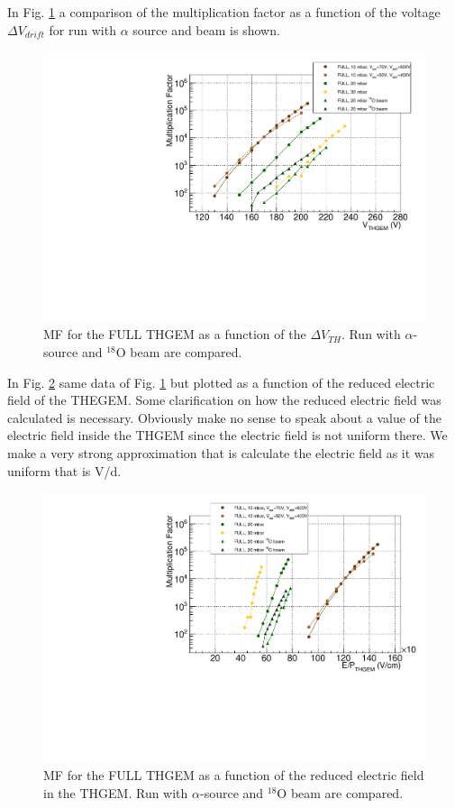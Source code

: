 \documentclass[a4paper, 11 pt]{report}
\newcommand{\Vthgem}{$\Delta V_{TH}$}
\newcommand{\Vdrift}{$ \Delta V_{drift}$}
\begin{document}
  In Fig. \ref{fig:MF_FULL_beam} a comparison of the multiplication factor as a function of the
  voltage \Vdrift{} for run with $\alpha$ source and beam is shown. 
  \begin{figure}[htbp]
	\centering
	\includegraphics[width=\textwidth]{Immagini/MF_FULL_THGEM_withBeam.pdf}
	\caption{MF for the FULL THGEM as a function of the \Vthgem{}. Run with $\alpha$-source
	and $^{18}$O beam are compared. }
	\label{fig:MF_FULL_beam}
  \end{figure}
  In Fig. \ref{fig:MF_FULL_beam_F} same data of Fig. \ref{fig:MF_FULL_beam} but plotted as a 
  function of the reduced electric field of the THEGEM. Some clarification on how the reduced 
  electric field was calculated is necessary. Obviously make no sense to speak about a value of 
  the electric field inside the THGEM since the electric field is not uniform there. We make a very
  strong approximation that is calculate the electric field as it was uniform that is V/d.
  \begin{figure}[htbp]
	\centering
	\includegraphics[width=\textwidth]{Immagini/MF_FULL_THGEM_withBeam_F.pdf}
	\caption{MF for the FULL THGEM as a function of the reduced electric field in the THGEM. Run 
	with $\alpha$-source and $^{18}$O beam are compared.}
	\label{fig:MF_FULL_beam_F}
  \end{figure}
\end{document}

